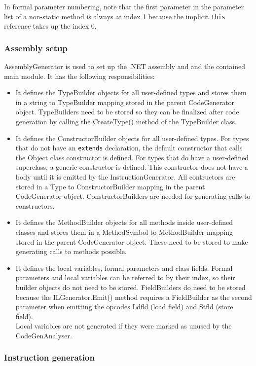 \documentclass[a4paper,11pt]{article}
\begin{document}
In formal parameter numbering, note that the first parameter in the parameter list of a non-static method is always at index 1 because the implicit \verb,this, reference takes up the index 0.

\subsubsection{Assembly setup}

AssemblyGenerator is used to set up the .NET assembly and and the contained main module. It has the following responsibilities:
\begin{itemize}
    \item It defines the TypeBuilder objects for all user-defined types and stores them in a string to TypeBuilder mapping stored in the parent CodeGenerator object. TypeBuilders need to be stored so they can be finalized after code generation by calling the CreateType() method of the TypeBuilder class.
    \item It defines the ConstructorBuilder objects for all user-defined types. For types that do not have an \verb,extends, declaration, the default constructor that calls the Object class constructor is defined. For types that do have a user-defined superclass, a generic constructor is defined. This constructor does not have a body until it is emitted by the InstructionGenerator. All contructors are stored in a Type to ConstructorBuilder mapping in the parent CodeGenerator object. ConstructorBuilders are needed for generating calls to constructors.
    \item It defines the MethodBuilder objects for all methods inside user-defined classes and stores them in a MethodSymbol to MethodBuilder mapping stored in the parent CodeGenerator object. These need to be stored to make generating calls to methods possible.
    \item It defines the local variables, formal parameters and class fields. Formal parameters and local variables can be referred to by their index, so their builder objects do not need to be stored. FieldBuilders do need to be stored because the ILGenerator.Emit() method requires a FieldBuilder as the second parameter when emitting the opcodes Ldfld (load field) and Stfld (store field). \\
        Local variables are not generated if they were marked as unused by the CodeGenAnalyser.
\end{itemize}

\subsubsection{Instruction generation}
\end{document}
